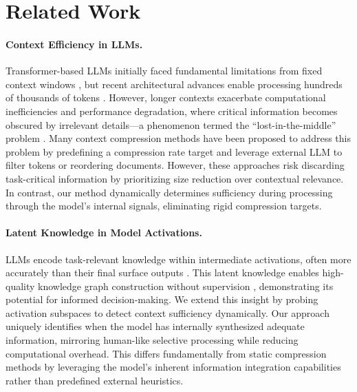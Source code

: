 \section*{Related Work}
\label{sec:related_work}
\paragraph{Context Efficiency in LLMs.} Transformer-based LLMs initially faced fundamental limitations from fixed context windows \citep{vaswani2017attention}, but recent architectural advances enable processing hundreds of thousands of tokens \citep{jin2024llm,reid2024gemini,llama3.1modelcard,deepseekr1}. However, longer contexts exacerbate computational inefficiencies and performance degradation, where critical information becomes obscured by irrelevant details—a phenomenon termed the ``lost-in-the-middle'' problem \citep{lostinmiddle,RULER}. 
Many context compression methods have been proposed to address this problem \citep{llmlingua,longllmlingua,llmlingua2,icformer,li2024500xcompressor} by predefining a compression rate target and leverage external LLM to filter tokens  or reordering documents. However, these approaches risk discarding task-critical information by prioritizing size reduction over contextual relevance. In contrast, our method dynamically determines sufficiency during processing through the model's internal signals, eliminating rigid compression targets.

\paragraph{Latent Knowledge in Model Activations.} LLMs encode task-relevant knowledge within intermediate activations, often more accurately than their final surface outputs \citep{saunders2022self,iti}. This latent knowledge enables high-quality knowledge graph construction without supervision \citep{wang2020language}, demonstrating its potential for informed decision-making. We extend this insight by probing activation subspaces to detect context sufficiency dynamically. Our approach uniquely identifies when the model has internally synthesized adequate information, mirroring human-like selective processing while reducing computational overhead. This differs fundamentally from static compression methods by leveraging the model's inherent information integration capabilities rather than predefined external heuristics.
